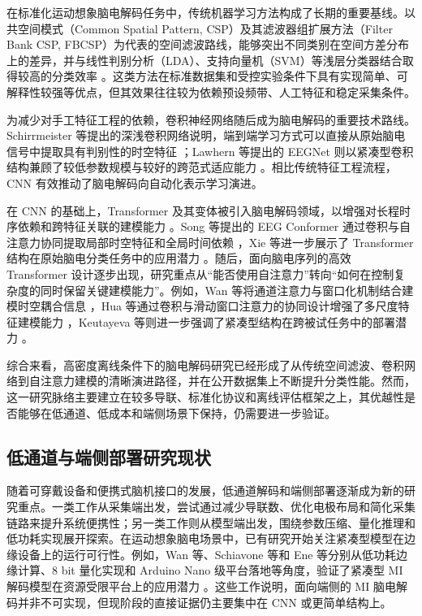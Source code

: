 在标准化运动想象脑电解码任务中，传统机器学习方法构成了长期的重要基线。以共空间模式（Common Spatial Pattern, CSP）及其滤波器组扩展方法（Filter Bank CSP, FBCSP）为代表的空间滤波路线，能够突出不同类别在空间方差分布上的差异，并与线性判别分析（LDA）、支持向量机（SVM）等浅层分类器结合取得较高的分类效率 \cite{ang2012filter, lotte2018review}。这类方法在标准数据集和受控实验条件下具有实现简单、可解释性较强等优点，但其效果往往较为依赖预设频带、人工特征和稳定采集条件。

\noindent
为减少对手工特征工程的依赖，卷积神经网络随后成为脑电解码的重要技术路线。Schirrmeister 等提出的深浅卷积网络说明，端到端学习方式可以直接从原始脑电信号中提取具有判别性的时空特征 \cite{schirrmeister2017deep}；Lawhern 等提出的 EEGNet 则以紧凑型卷积结构兼顾了较低参数规模与较好的跨范式适应能力 \cite{lawhern2018eegnet}。相比传统特征工程流程，CNN 有效推动了脑电解码向自动化表示学习演进。

\noindent
在 CNN 的基础上，Transformer 及其变体被引入脑电解码领域，以增强对长程时序依赖和跨特征关联的建模能力 \cite{vaswani2017attention}。Song 等提出的 EEG Conformer 通过卷积与自注意力协同提取局部时空特征和全局时间依赖 \cite{songEEG2022}，Xie 等进一步展示了 Transformer 结构在原始脑电分类任务中的应用潜力 \cite{xie_transformer-based_2022}。随后，面向脑电序列的高效 Transformer 设计逐步出现，研究重点从“能否使用自注意力”转向“如何在控制复杂度的同时保留关键建模能力”。例如，Wan 等将通道注意力与窗口化机制结合建模时空耦合信息 \cite{wan2023novel}，Hua 等通过卷积与滑动窗口注意力的协同设计增强了多尺度特征建模能力 \cite{hua2023improved}，Keutayeva 等则进一步强调了紧凑型结构在跨被试任务中的部署潜力 \cite{keu2024compact}。

\noindent
综合来看，高密度离线条件下的脑电解码研究已经形成了从传统空间滤波、卷积网络到自注意力建模的清晰演进路径，并在公开数据集上不断提升分类性能。然而，这一研究脉络主要建立在较多导联、标准化协议和离线评估框架之上，其优越性是否能够在低通道、低成本和端侧场景下保持，仍需要进一步验证。

\subsection{低通道与端侧部署研究现状}

随着可穿戴设备和便携式脑机接口的发展，低通道解码和端侧部署逐渐成为新的研究重点。一类工作从采集端出发，尝试通过减少导联数、优化电极布局和简化采集链路来提升系统便携性；另一类工作则从模型端出发，围绕参数压缩、量化推理和低功耗实现展开探索。在运动想象脑电场景中，已有研究开始关注紧凑型模型在边缘设备上的运行可行性。例如，Wan 等、Schiavone 等和 Ene 等分别从低功耗边缘计算、8 bit 量化实现和 Arduino Nano 级平台落地等角度，验证了紧凑型 MI 解码模型在资源受限平台上的应用潜力 \cite{Wan20, Sch20, Wan22b, Ene23}。这些工作说明，面向端侧的 MI 脑电解码并非不可实现，但现阶段的直接证据仍主要集中在 CNN 或更简单结构上。

